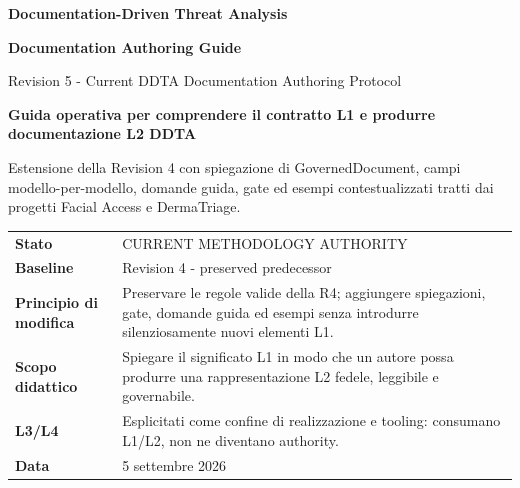 \documentclass[11pt,a4paper]{article}
\begin{document}

\begin{titlepage}
\thispagestyle{empty}
\vspace*{8mm}

{\sffamily\bfseries\color{DDTANavy}\fontsize{15}{18}\selectfont Documentation-Driven Threat Analysis}\par
\vspace{5mm}
{\sffamily\bfseries\color{DDTANavy}\fontsize{30}{34}\selectfont Documentation Authoring Guide}\par
\vspace{2mm}
{\sffamily\color{DDTABlue}\fontsize{19}{23}\selectfont Revision 5 - Current DDTA Documentation Authoring Protocol}\par

\vspace{10mm}
\begin{tcolorbox}[enhanced,arc=3pt,boxrule=0pt,colback=DDTANavy,left=12pt,right=12pt,top=11pt,bottom=11pt]
{\color{white}\sffamily\bfseries\large Guida operativa per comprendere il contratto L1 e produrre documentazione L2 DDTA}\par
\vspace{2mm}
{\color{white!88}\small Estensione della Revision 4 con spiegazione di GovernedDocument, campi modello-per-modello, domande guida, gate ed esempi contestualizzati tratti dai progetti Facial Access e DermaTriage.}
\end{tcolorbox}

\vspace{8mm}
\begin{tabularx}{\textwidth}{L{42mm}Y}
\toprule
\textbf{Stato} & CURRENT METHODOLOGY AUTHORITY \\
\textbf{Baseline} & Revision 4 - preserved predecessor \\
\textbf{Principio di modifica} & Preservare le regole valide della R4; aggiungere spiegazioni, gate, domande guida ed esempi senza introdurre silenziosamente nuovi elementi L1. \\
\textbf{Scopo didattico} & Spiegare il significato L1 in modo che un autore possa produrre una rappresentazione L2 fedele, leggibile e governabile. \\
\textbf{L3/L4} & Esplicitati come confine di realizzazione e tooling: consumano L1/L2, non ne diventano authority. \\
\textbf{Data} & 5 settembre 2026 \\
\bottomrule
\end{tabularx}


\end{titlepage}
\end{document}
